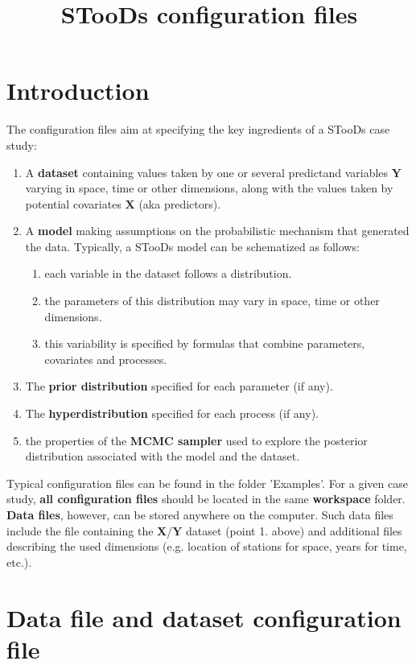 \documentclass[a4paper]{article}
\title{STooDs configuration files}
\begin{document}
	
	\maketitle
	
	\section{Introduction}
	
	The configuration files aim at specifying the key ingredients of a STooDs case study:
	\begin{enumerate}
		\item A \textbf{dataset} containing values taken by one or several predictand variables $\boldsymbol{Y}$ varying in space, time or other dimensions, along with the values taken by potential covariates $\boldsymbol{X}$ (aka predictors).
		\item A \textbf{model} making assumptions on the probabilistic mechanism that generated the data. Typically, a STooDs model can be schematized as follows: 
			\begin{enumerate}
				\item each variable in the dataset follows a distribution.
				\item the parameters of this distribution may vary in space, time or other dimensions.
				\item this variability is specified by formulas that combine parameters, covariates and processes.
			\end{enumerate}
		\item The \textbf{prior distribution} specified for each parameter (if any).
		\item The \textbf{hyperdistribution} specified for each process (if any).
		\item the properties of the \textbf{MCMC sampler} used to explore the posterior distribution associated with the model and the dataset.		
	\end{enumerate}
	
	Typical configuration files can be found in the folder 'Examples'. For a given case study, \textbf{all configuration files} should be located in the same \textbf{workspace} folder. \textbf{Data files}, however, can be stored anywhere on the computer. Such data files include the file containing the $\boldsymbol{X}$/$\boldsymbol{Y}$ dataset (point 1. above) and additional files describing the used dimensions (e.g. location of stations for space, years for time, etc.).
	
	\section{Data file and dataset configuration file}
		
\end{document}
